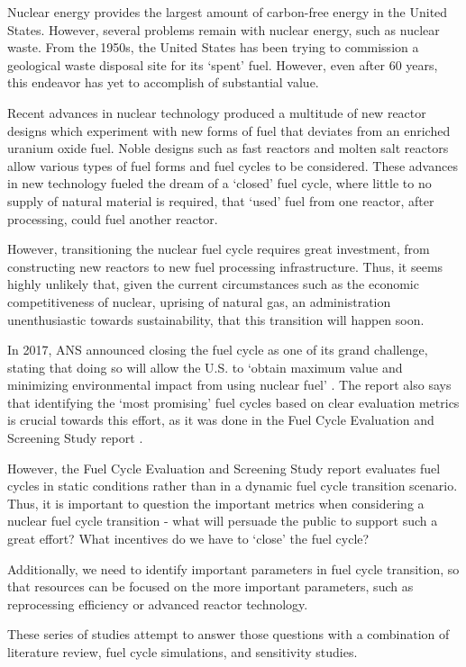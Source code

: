 Nuclear energy provides the largest amount of carbon-free energy
in the United States. However, several problems remain with nuclear
energy, such as nuclear waste.
From the 1950s, the United States has been trying to commission a
geological waste disposal site for its `spent' fuel. However, even
after 60 years, this endeavor has yet to accomplish of substantial value.

Recent advances in nuclear technology produced
a multitude of new reactor designs which experiment with new forms
of fuel that deviates from an enriched uranium oxide fuel.
Noble designs such as fast reactors and molten salt reactors
allow various types of fuel forms and fuel cycles to be considered. These advances in new
technology fueled the dream of a `closed' fuel cycle, where little to no
supply of natural material is required, that `used' fuel from one reactor,
after processing, could fuel another reactor.

However, transitioning the nuclear fuel cycle requires great investment,
from constructing new reactors to new fuel processing infrastructure.
Thus, it seems highly unlikely that, given the current circumstances
such as the economic competitiveness of nuclear, uprising of natural
gas, an administration unenthusiastic towards sustainability, that
this transition will happen soon.

In 2017, \gls{ANS} announced closing the fuel cycle as one of its
grand challenge, stating that doing so will allow the U.S.
to `obtain maximum value and minimizing environmental
impact from using nuclear fuel' \cite{_ans_2017}.
The report also says that identifying the `most promising'
fuel cycles based on clear evaluation metrics is crucial towards
this effort, as it was done in the Fuel Cycle Evaluation and Screening
Study report \cite{wigeland_nuclear_2014}.

However, the Fuel Cycle Evaluation and Screening Study report
evaluates fuel cycles in static conditions rather than
in a dynamic fuel cycle transition scenario.
Thus, it is important to question the important metrics when considering
a nuclear fuel cycle transition - what will persuade
the public to support such a great effort? What incentives
do we have to `close' the fuel cycle?

Additionally, we need to identify important parameters in
fuel cycle transition, so that resources can be
focused on the more important parameters, such as reprocessing
efficiency or advanced reactor technology.

These series of studies attempt to answer those questions with a
combination of literature review, fuel cycle simulations, and sensitivity
studies.
